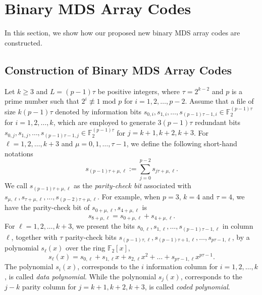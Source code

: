 \documentclass[conference]{IEEEtran}
\begin{document}



\section{Binary MDS Array Codes}
\label{sec:constr}
In this section, we show how our proposed new binary MDS array codes are constructed.
\subsection{Construction of Binary MDS Array Codes}
Let $k\geq 3$ and $L=(p-1)\tau$ be positive integers, where $\tau=2^{k-2}$ and $p$ is a prime number such that $2^i\not\equiv 1\text{ mod } p$ for $i=1,2,\ldots,p-2$. Assume that a file of size $k(p-1)\tau$ denoted by information bits $s_{0,i},s_{1,i},\ldots, s_{(p-1)\tau-1,i}\in \mathbb{F}_2^{(p-1)\tau}$ for $i=1,2,\ldots,k$, which are employed to generate $3(p-1)\tau$ redundant bits $s_{0,j},s_{1,j},\ldots, s_{(p-1)\tau-1,j}\in \mathbb{F}_2^{(p-1)\tau}$ for $j=k+1,k+2,k+3$.
For $\ell=1,2,\ldots,k+3$ and $\mu=0,1,\ldots,\tau-1$, we define the following short-hand notations
\begin{equation}
s_{(p-1)\tau+\mu,\ell} := \sum_{j=0}^{p-2} s_{j\tau+\mu,\ell}.
\label{eq:check1}
\end{equation}
We call $s_{(p-1)\tau+\mu,\ell}$ as the \emph{parity-check bit} associated with $s_{\mu,\ell},s_{\tau+\mu,\ell},\ldots,s_{(p-2)\tau+\mu,\ell}$. For example, when $p=3$, $k=4$ and $\tau=4$, we have the parity-check bit of $s_{0+\mu,\ell},s_{4+\mu,\ell}$ is $$s_{8+\mu,\ell}=s_{0+\mu,\ell}+s_{4+\mu,\ell}.$$ For $\ell=1,2,\ldots,k+3$, we present the bits $s_{0,\ell},s_{1,\ell},\ldots,s_{(p-1)\tau-1,\ell}$ in column $\ell$, together with $\tau$ parity-check bits $s_{(p-1)\tau,\ell},s_{(p-1)\tau+1,\ell},\ldots,s_{p\tau-1,\ell}$, by a polynomial $s_{\ell}(x)$ over the ring $\mathbb{F}_2[x]$,
$$s_\ell(x)=s_{0,\ell}+s_{1,\ell}x+s_{2,\ell}x^2+\ldots+s_{p\tau-1,\ell}x^{p\tau-1}.$$
The polynomial $s_{i}(x)$, corresponds to the $i$ information column for $i=1,2,\ldots,k$, is called \emph{data polynomial}. While the polynomial $s_{j}(x)$, corresponds to the $j-k$ parity column for $j=k+1,k+2,k+3$, is called \emph{coded polynomial}.
\end{document}
